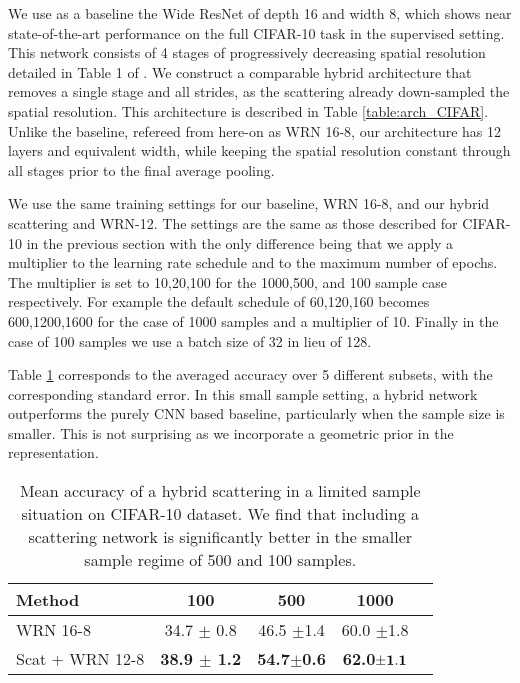 \documentclass[10pt,twocolumn,letterpaper]{article}
\begin{document}
We use as a  baseline the Wide ResNet \cite{zagoruyko2016wide} of depth 16 and width 8, which shows near state-of-the-art performance on the full CIFAR-10 task in the supervised setting. This network consists of 4 stages of progressively decreasing spatial resolution detailed in Table 1 of \cite{zagoruyko2016wide}. We construct a comparable hybrid architecture that removes a single stage and all strides, as the scattering already down-sampled the spatial resolution. This architecture is described in Table \ref{table:arch_CIFAR}.  Unlike the baseline, refereed from here-on as WRN 16-8, our architecture has 12 layers and equivalent width, while keeping the spatial resolution constant through all stages prior to the final average pooling.

We use the same training settings for our baseline, WRN 16-8, and our hybrid scattering and WRN-12. The settings are the same as  those described for CIFAR-10 in the previous section with the only difference being that we apply a multiplier to the learning rate schedule and to the maximum number of epochs. The multiplier is set to 10,20,100 for the 1000,500, and 100 sample case respectively. For example the default schedule of 60,120,160 becomes 600,1200,1600 for the case of 1000 samples and a multiplier of 10. Finally in the case of 100 samples we use a batch size of 32 in lieu of 128.



Table \ref{small} corresponds to the averaged accuracy over 5 different subsets, with the corresponding standard error. 
In this small sample setting, a hybrid network outperforms the purely CNN based baseline, particularly when the sample size is smaller. This is not surprising as we incorporate a geometric prior in the representation. 








\begin{table}
\begin{center}


\begin{tabular}{|l|c|c|c|c|}
\hline
\bf Method & \bf 100 & \bf 500 & \bf 1000 \\
  \hline 

WRN 16-8    & 34.7 $\pm$ 0.8  &    46.5 $\pm$1.4& 60.0 $\pm$1.8  \\
Scat + WRN 12-8 & \bf 38.9 $\pm$ 1.2 &\bf 54.7$\pm$0.6 &\bf 62.0$\pm\bf 1.1$ \\

\hline
\end{tabular}
\end{center}
\caption{Mean accuracy of a hybrid scattering in a limited sample situation on CIFAR-10 dataset. We find that including a scattering network is significantly better in the smaller sample regime of 500 and 100 samples.}

\label{small}
\end{table}
\end{document}
